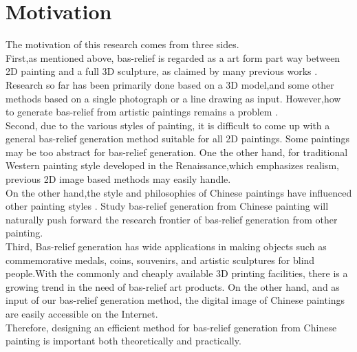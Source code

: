 \section{Motivation}
The motivation of this research comes from three sides.\\First,as mentioned above, bas-relief is regarded as a art form part way between 2D painting and a full 3D sculpture, as claimed by many previous works \cite{benzaid2017analysis}\cite{weyrich2007digital}\cite{kerber2009feature}\cite{kerber2012computer}\cite{zeng2014region}. Research so far has been primarily done based on a 3D model,and some other methods based on a single photograph\cite{zeng2014region}\cite{wu2013making}  \cite{alexa2010reliefs}\cite{wu2008interactive} or a line drawing \cite{kolomenkin2011reconstruction}\cite{varley2002estimating}\cite{malik1987interpreting}\cite{sykora2014ink} as input. However,how to generate bas-relief from artistic paintings remains a problem .\\
Second, due to the various styles of painting, it is difficult to come up with a general bas-relief generation method suitable for all 2D paintings. Some paintings may be too abstract for bas-relief generation. One the other hand, for traditional Western painting style developed in the Renaissance,which emphasizes realism\cite{chu2004real}, previous 2D image based methods may easily handle.\\
On the other hand,the style and philosophies of Chinese paintings have influenced other painting styles \cite{chu2004real}. Study bas-relief generation from Chinese painting will naturally push forward the research frontier of bas-relief generation from other painting. \\
Third, Bas-relief generation has wide applications in making objects such as commemorative medals, coins, souvenirs, and artistic sculptures for blind people.With the commonly and cheaply available 3D printing facilities, there is a growing trend in the need of bas-relief art products. On the other hand, and as input of our bas-relief generation method, the digital image of Chinese paintings are easily accessible on the Internet.    \\
Therefore, designing an efficient method for bas-relief generation from Chinese painting is important both theoretically and practically.\\ \\

